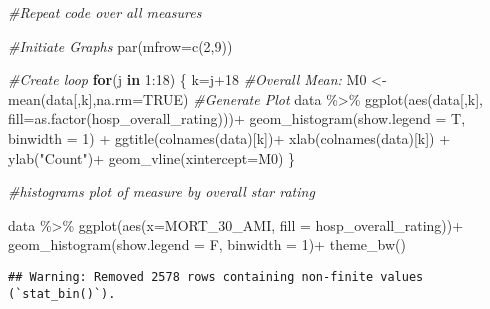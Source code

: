 \documentclass[
]{article}
\newenvironment{Shaded}{\begin{snugshade}}{\end{snugshade}}
\newcommand{\AttributeTok}[1]{\textcolor[rgb]{0.77,0.63,0.00}{#1}}
\newcommand{\CommentTok}[1]{\textcolor[rgb]{0.56,0.35,0.01}{\textit{#1}}}
\newcommand{\ConstantTok}[1]{\textcolor[rgb]{0.00,0.00,0.00}{#1}}
\newcommand{\ControlFlowTok}[1]{\textcolor[rgb]{0.13,0.29,0.53}{\textbf{#1}}}
\newcommand{\DecValTok}[1]{\textcolor[rgb]{0.00,0.00,0.81}{#1}}
\newcommand{\FunctionTok}[1]{\textcolor[rgb]{0.00,0.00,0.00}{#1}}
\newcommand{\NormalTok}[1]{#1}
\newcommand{\OtherTok}[1]{\textcolor[rgb]{0.56,0.35,0.01}{#1}}
\newcommand{\SpecialCharTok}[1]{\textcolor[rgb]{0.00,0.00,0.00}{#1}}
\newcommand{\StringTok}[1]{\textcolor[rgb]{0.31,0.60,0.02}{#1}}
\begin{document}
\begin{Shaded}
\begin{Highlighting}[]
\CommentTok{\#Repeat code over all measures}

\CommentTok{\#Initiate Graphs}
\FunctionTok{par}\NormalTok{(}\AttributeTok{mfrow=}\FunctionTok{c}\NormalTok{(}\DecValTok{2}\NormalTok{,}\DecValTok{9}\NormalTok{))}

\CommentTok{\#Create loop}
\ControlFlowTok{for}\NormalTok{(j }\ControlFlowTok{in} \DecValTok{1}\SpecialCharTok{:}\DecValTok{18}\NormalTok{) \{}
\NormalTok{  k}\OtherTok{=}\NormalTok{j}\SpecialCharTok{+}\DecValTok{18}
  \CommentTok{\#Overall Mean:}
\NormalTok{  M0 }\OtherTok{\textless{}{-}} \FunctionTok{mean}\NormalTok{(data[,k],}\AttributeTok{na.rm=}\ConstantTok{TRUE}\NormalTok{)}
  \CommentTok{\#Generate Plot}
\NormalTok{  data }\SpecialCharTok{\%\textgreater{}\%} \FunctionTok{ggplot}\NormalTok{(}\FunctionTok{aes}\NormalTok{(data[,k],}
                      \AttributeTok{fill=}\FunctionTok{as.factor}\NormalTok{(hosp\_overall\_rating)))}\SpecialCharTok{+}
    \FunctionTok{geom\_histogram}\NormalTok{(}\AttributeTok{show.legend =}\NormalTok{ T, }\AttributeTok{binwidth =} \DecValTok{1}\NormalTok{) }\SpecialCharTok{+}
    \FunctionTok{ggtitle}\NormalTok{(}\FunctionTok{colnames}\NormalTok{(data)[k])}\SpecialCharTok{+}
    \FunctionTok{xlab}\NormalTok{(}\FunctionTok{colnames}\NormalTok{(data)[k]) }\SpecialCharTok{+} \FunctionTok{ylab}\NormalTok{(}\StringTok{"Count"}\NormalTok{)}\SpecialCharTok{+}
    \FunctionTok{geom\_vline}\NormalTok{(}\AttributeTok{xintercept=}\NormalTok{M0)}
\NormalTok{\}}
\end{Highlighting}
\end{Shaded}

\begin{Shaded}
\begin{Highlighting}[]
\CommentTok{\#histograms plot of measure by overall star rating}

\NormalTok{data }\SpecialCharTok{\%\textgreater{}\%} \FunctionTok{ggplot}\NormalTok{(}\FunctionTok{aes}\NormalTok{(}\AttributeTok{x=}\NormalTok{MORT\_30\_AMI, }\AttributeTok{fill =}\NormalTok{ hosp\_overall\_rating))}\SpecialCharTok{+}
  \FunctionTok{geom\_histogram}\NormalTok{(}\AttributeTok{show.legend =}\NormalTok{ F, }\AttributeTok{binwidth =} \DecValTok{1}\NormalTok{)}\SpecialCharTok{+}
  \FunctionTok{theme\_bw}\NormalTok{()}
\end{Highlighting}
\end{Shaded}

\begin{verbatim}
## Warning: Removed 2578 rows containing non-finite values (`stat_bin()`).
\end{verbatim}
\end{document}
